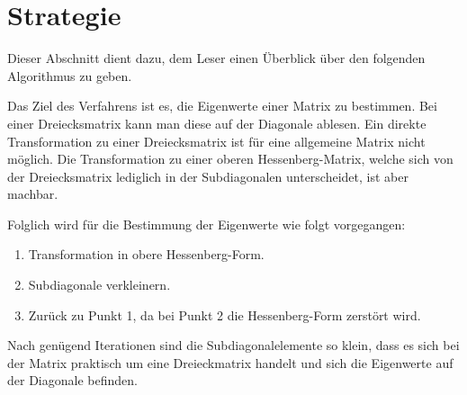 \section{Strategie\label{francis:section:strategie}}
Dieser Abschnitt dient dazu, dem Leser einen Überblick über den folgenden Algorithmus zu geben.

Das Ziel des Verfahrens ist es, die Eigenwerte einer Matrix zu bestimmen.
Bei einer Dreiecksmatrix kann man diese auf der Diagonale ablesen.
Ein direkte Transformation zu einer Dreiecksmatrix ist für eine allgemeine Matrix nicht möglich.
Die Transformation zu einer oberen Hessenberg-Matrix, welche sich von der Dreiecksmatrix lediglich in der Subdiagonalen unterscheidet, ist aber machbar.

Folglich wird für die Bestimmung der Eigenwerte wie folgt vorgegangen:
\begin{enumerate}
	\item Transformation in obere Hessenberg-Form.
	\item Subdiagonale verkleinern.
	\item Zurück zu Punkt 1, da bei Punkt 2 die Hessenberg-Form zerstört wird.
\end{enumerate}
Nach genügend Iterationen sind die Subdiagonalelemente so klein, dass es sich bei der Matrix praktisch um eine Dreieckmatrix handelt und sich die Eigenwerte auf der Diagonale befinden.

